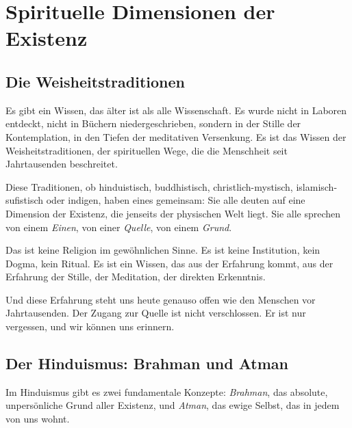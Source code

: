 
\chapter{Spirituelle Dimensionen der Existenz}

\section{Die Weisheitstraditionen}

Es gibt ein Wissen, das älter ist als alle Wissenschaft. Es wurde nicht in Laboren entdeckt, nicht in Büchern niedergeschrieben, sondern in der Stille der Kontemplation, in den Tiefen der meditativen Versenkung. Es ist das Wissen der Weisheitstraditionen, der spirituellen Wege, die die Menschheit seit Jahrtausenden beschreitet.

Diese Traditionen, ob hinduistisch, buddhistisch, christlich-mystisch, islamisch-sufistisch oder indigen, haben eines gemeinsam: Sie alle deuten auf eine Dimension der Existenz, die jenseits der physischen Welt liegt. Sie alle sprechen von einem \emph{Einen}, von einer \emph{Quelle}, von einem \emph{Grund}.

Das ist keine Religion im gewöhnlichen Sinne. Es ist keine Institution, kein Dogma, kein Ritual. Es ist ein Wissen, das aus der Erfahrung kommt, aus der Erfahrung der Stille, der Meditation, der direkten Erkenntnis.

Und diese Erfahrung steht uns heute genauso offen wie den Menschen vor Jahrtausenden. Der Zugang zur Quelle ist nicht verschlossen. Er ist nur vergessen, und wir können uns erinnern.

\section{Der Hinduismus: Brahman und Atman}

Im Hinduismus gibt es zwei fundamentale Konzepte: \emph{Brahman}, das absolute, unpersönliche Grund aller Existenz, und \emph{Atman}, das ewige Selbst, das in jedem von uns wohnt.

